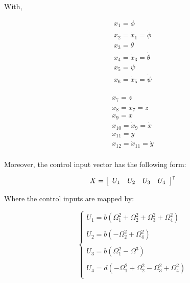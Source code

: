 \documentclass{thesisreport}
\begin{document}
 With,
 
\begin{multicols}{2}
 
\begin{equation*}
\begin{aligned}
x_1 = \phi\\
x_2 = \dot{x}_1=\dot{\phi}\\
x_3 = \theta\\
x_4 = \dot{x}_3 = \dot{\theta} \\
x_5 = \psi \\
x_6 = \dot{x}_5 = \dot{\psi}\\
\end{aligned}
\end{equation*}

\columnbreak

\begin{equation}
\begin{aligned}
x_7 = z\\
x_8 = \dot{x}_7=\dot{z}\\
x_9 = x\\
x_{10} = \dot{x}_9 = \dot{x} \\
x_{11} = y \\
x_{12} = \dot{x}_{11} = \dot{y}\\
\end{aligned}
\end{equation}

\end{multicols}
 
Moreover, the control input vector has the following form: 

\begin{equation}\label{control_input_vector}
X = \left[\begin{array}{c c c c}
U_1 & U_2 & U_3 & U_4 
\end{array}\right]^{\intercal}
\end{equation}

Where the control inputs are mapped by: 

\begin{equation}\label{Control_input_mapping}
\begin{cases}
U_1 = b(\Omega_1^2 + \Omega_2^2 + \Omega_3^2 + \Omega_4^2)\\
\\
U_2 = b(-\Omega_2^2 + \Omega_4^2)\\
\\
U_3 = b(\Omega_1^2 - \Omega^3)\\
\\
U_4 = d(-\Omega_1^2 + \Omega_2^2 - \Omega_3^2 + \Omega_4^2) \\
\end{cases}
\end{equation}
\end{document}
